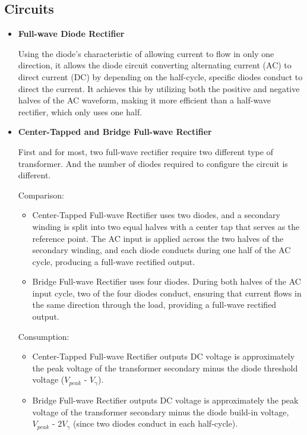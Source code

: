      \subsection{Circuits}
        \begin{itemize}
            \item \textbf{Full-wave Diode Rectifier}\par
            Using the diode's characteristic of allowing current to flow in only one direction, it allows the diode circuit converting alternating current (AC) to direct current (DC) by depending on the half-cycle, specific diodes conduct to direct the current. It achieves this by utilizing both the positive and negative halves of the AC waveform, making it more efficient than a half-wave rectifier, which only uses one half.

            \item \textbf{Center-Tapped and Bridge Full-wave Rectifier}\par
            First and for most, two full-wave rectifier require two different type of transformer. And the number of diodes required to configure the circuit is different.\par
            Comparison:\par
            \begin{itemize}
                \item Center-Tapped Full-wave Rectifier uses two diodes, and a secondary winding is split into two equal halves with a center tap that serves as the reference point. The AC input is applied across the two halves of the secondary winding, and each diode conducts during one half of the AC cycle, producing a full-wave rectified output.
                \item Bridge Full-wave Rectifier uses four diodes. During both halves of the AC input cycle, two of the four diodes conduct, ensuring that current flows in the same direction through the load, providing a full-wave rectified output.
            \end{itemize}
            Consumption:\par
            \begin{itemize}
                \item Center-Tapped Full-wave Rectifier outputs DC voltage is approximately the peak voltage of the transformer secondary minus the diode threshold voltage ($V_{peak}$ - $V_\gamma$).
                \item Bridge Full-wave Rectifier outputs DC voltage is approximately the peak voltage of the transformer secondary minus the diode build-in voltage, $V_{peak}$ - 2$V_\gamma$ (since two diodes conduct in each half-cycle).
            \end{itemize}
        \end{itemize}
        
